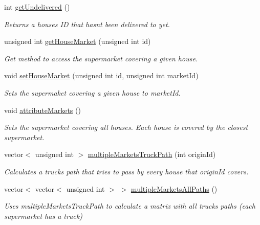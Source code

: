 \begin{DoxyCompactItemize}
int \hyperlink{class_market_delivery_system_aa7d34d0e49383b926a7a85a2f4b20439}{get\+Undelivered} ()
\begin{DoxyCompactList}\small\item\em Returns a house\textquotesingle{}s ID that hasn\textquotesingle{}t been delivered to yet. \end{DoxyCompactList}\item 
unsigned int \hyperlink{class_market_delivery_system_ae4079938c218b1cbfcd2fe2908dbf85f}{get\+House\+Market} (unsigned int id)
\begin{DoxyCompactList}\small\item\em Get method to access the supermarket covering a given house. \end{DoxyCompactList}\item 
void \hyperlink{class_market_delivery_system_a2f72e9abcf4e6f7f36ebb58fbc54dc3f}{set\+House\+Market} (unsigned int id, unsigned int market\+Id)
\begin{DoxyCompactList}\small\item\em Sets the supermaket covering a given house to market\+Id. \end{DoxyCompactList}\item 
\hypertarget{class_market_delivery_system_aa992f6b8848dc3956be89c6ed5a8a17f}{}\label{class_market_delivery_system_aa992f6b8848dc3956be89c6ed5a8a17f} 
void \hyperlink{class_market_delivery_system_aa992f6b8848dc3956be89c6ed5a8a17f}{attribute\+Markets} ()
\begin{DoxyCompactList}\small\item\em Sets the supermarket covering all houses. Each house is covered by the closest supermarket. \end{DoxyCompactList}\item 
vector$<$ unsigned int $>$ \hyperlink{class_market_delivery_system_a3bb2340fbf83f3fbb5e67b1dca4b6c53}{multiple\+Markets\+Truck\+Path} (int origin\+Id)
\begin{DoxyCompactList}\small\item\em Calculates a truck\textquotesingle{}s path that tries to pass by every house that origin\+Id covers. \end{DoxyCompactList}\item 
vector$<$ vector$<$ unsigned int $>$ $>$ \hyperlink{class_market_delivery_system_a74907c35eeafc05d77b90d4b99b3dcd5}{multiple\+Markets\+All\+Paths} ()
\begin{DoxyCompactList}\small\item\em Uses multiple\+Markets\+Truck\+Path to calculate a matrix with all trucks paths\textquotesingle{} (each supermarket has a truck) \end{DoxyCompactList}\item 

\end{DoxyCompactItemize}
